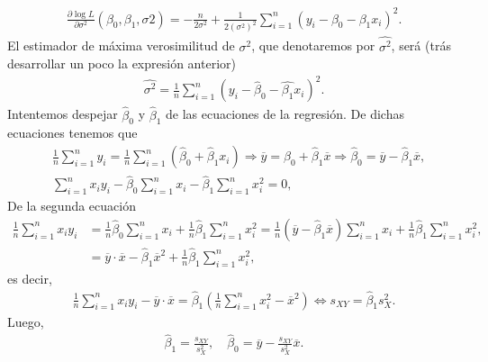 \begin{align*}
    \frac{\partial \log L}{\partial \sigma^2}(\beta_0, \beta_1,\sigma2) = - \frac{n}{2\sigma^2} + \frac{1}{2(\sigma^2)^2} \sum_{i=1}^{n} (y_i - \beta_0 - \beta_1 x_i)^2.
\end{align*}
El estimador de máxima verosimilitud de $\sigma^2$, que denotaremos por $\widehat{\sigma^2}$, será (trás desarrollar un poco la expresión anterior)
\begin{align*}
\boxed{
    \widehat{\sigma^2} = \frac{1}{n} \sum_{i=1}^{n} (y_i - \widehat{\beta}_0 - \widehat{\beta_1} x_i)^2.
    }
\end{align*}
Intentemos despejar $\widehat{\beta}_0$ y $\widehat{\beta}_1$ de las ecuaciones de la regresión. De dichas ecuaciones tenemos que
\begin{align*}
    &\frac{1}{n} \sum_{i=1}^{n} y_i = \frac{1}{n} \sum_{i=1}^{n}(\widehat{\beta}_0 + \widehat{\beta}_1x_i) \Longrightarrow \overline{y} = \widehat{\beta}_0 + \widehat{\beta}_1 \overline{x} \Longrightarrow \widehat{\beta}_0 = \overline{y} - \widehat{\beta}_1 \overline{x},\\
    &\sum_{i=1}^{n} x_iy_i - \widehat{\beta}_0 \sum_{i=1}^{n} x_i - \widehat{\beta}_1 \sum_{i=1}^{n} x_i^2 = 0,
\end{align*}
De la segunda ecuación
\begin{align*}
    \frac{1}{n}\sum_{i=1}^{n} x_iy_i &= \frac{1}{n}\widehat{\beta}_0 \sum_{i=1}^{n} x_i + \frac{1}{n} \widehat{\beta}_1 \sum_{i=1}^{n} x_i^2 
    = \frac{1}{n}(\overline{y} - \widehat{\beta}_1\overline{x}) \sum_{i=1}^{n} x_i + \frac{1}{n}\widehat{\beta}_1 \sum_{i=1}^{n} x_i^2, \\
    &= \overline{y} \cdot \overline{x} - \widehat{\beta}_1 \overline{x}^2 + \frac{1}{n} \widehat{\beta}_1 \sum_{i=1}^{n} x_i^2,
\end{align*}
es decir,
\begin{align*}
    \frac{1}{n}\sum_{i=1}^{n} x_iy_i - \overline{y} \cdot \overline{x} = \widehat{\beta}_1 \left( \frac{1}{n} \sum_{i=1}^{n} x_i^2 - \overline{x}^2 \right) \Longleftrightarrow s_{XY} = \widehat{\beta}_1 s_X^2.
\end{align*}
Luego,
\begin{align*}
\boxed{
    \widehat{\beta}_1 = \frac{s_{XY}}{s_X^2}, \quad \widehat{\beta}_0 = \overline{y} - \frac{s_{XY}}{s_X^2}\overline{x}.
    }
\end{align*}

